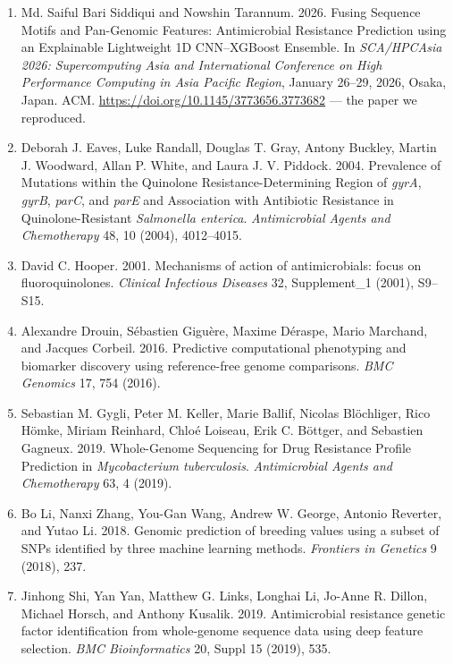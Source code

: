 \documentclass[11pt]{article}
\begin{document}
\begin{enumerate}[leftmargin=2.2em, itemsep=0.4em]

\item Md. Saiful Bari Siddiqui and Nowshin Tarannum. 2026. Fusing Sequence Motifs and Pan-Genomic Features: Antimicrobial Resistance Prediction using an Explainable Lightweight 1D CNN--XGBoost Ensemble. In \textit{SCA/HPCAsia 2026: Supercomputing Asia and International Conference on High Performance Computing in Asia Pacific Region}, January 26--29, 2026, Osaka, Japan. ACM. \url{https://doi.org/10.1145/3773656.3773682} --- the paper we reproduced.

\item Deborah J. Eaves, Luke Randall, Douglas T. Gray, Antony Buckley, Martin J. Woodward, Allan P. White, and Laura J. V. Piddock. 2004. Prevalence of Mutations within the Quinolone Resistance-Determining Region of \textit{gyrA}, \textit{gyrB}, \textit{parC}, and \textit{parE} and Association with Antibiotic Resistance in Quinolone-Resistant \textit{Salmonella enterica}. \textit{Antimicrobial Agents and Chemotherapy} 48, 10 (2004), 4012--4015.

\item David C. Hooper. 2001. Mechanisms of action of antimicrobials: focus on fluoroquinolones. \textit{Clinical Infectious Diseases} 32, Supplement\_1 (2001), S9--S15.

\item Alexandre Drouin, S\'ebastien Gigu\`ere, Maxime D\'eraspe, Mario Marchand, and Jacques Corbeil. 2016. Predictive computational phenotyping and biomarker discovery using reference-free genome comparisons. \textit{BMC Genomics} 17, 754 (2016).

\item Sebastian M. Gygli, Peter M. Keller, Marie Ballif, Nicolas Bl\"ochliger, Rico H\"omke, Miriam Reinhard, Chlo\'e Loiseau, Erik C. B\"ottger, and Sebastien Gagneux. 2019. Whole-Genome Sequencing for Drug Resistance Profile Prediction in \textit{Mycobacterium tuberculosis}. \textit{Antimicrobial Agents and Chemotherapy} 63, 4 (2019).

\item Bo Li, Nanxi Zhang, You-Gan Wang, Andrew W. George, Antonio Reverter, and Yutao Li. 2018. Genomic prediction of breeding values using a subset of SNPs identified by three machine learning methods. \textit{Frontiers in Genetics} 9 (2018), 237.

\item Jinhong Shi, Yan Yan, Matthew G. Links, Longhai Li, Jo-Anne R. Dillon, Michael Horsch, and Anthony Kusalik. 2019. Antimicrobial resistance genetic factor identification from whole-genome sequence data using deep feature selection. \textit{BMC Bioinformatics} 20, Suppl 15 (2019), 535.


\end{enumerate}
\end{document}
